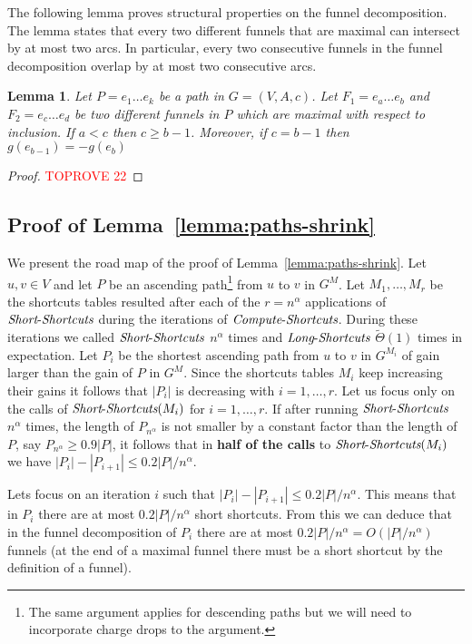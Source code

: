 \documentclass[11pt]{article}
\newtheorem{lemma}[theorem]{Lemma}
\newcommand{\LS}{\mbox{{\it Long}-{\it Shortcuts}}}
\newcommand{\Simple}{\mbox{{\it Short}-{\it Shortcuts}}}
\newcommand{\ComputeS}{\mbox{{\it Compute}-{\it Shortcuts}}}
\begin{document}
The following lemma proves structural properties on the funnel decomposition.
The lemma states that every two different funnels that are maximal can intersect by at most two arcs. In particular, every two consecutive funnels in the funnel decomposition overlap by at most two consecutive arcs.

\begin{lemma}\label{lemma:funnel-intersection}
    Let $P= e_1 \ldots e_k$ be a path in $G=(V,A,c)$. Let $F_1= e_a\ldots e_b$ and $F_2=e_c \ldots e_d$ be two different funnels in $P$ which are maximal with respect to inclusion. If $a<c$ then $c\ge b-1$. Moreover, if $c=b-1$ then $g(e_{b-1})=-g(e_{b})$
\end{lemma}

\begin{proof}\textcolor{red}{TOPROVE 22}\end{proof}


\subsection{Proof of Lemma~\ref{lemma:paths-shrink}}

We present the road map of the proof of Lemma~\ref{lemma:paths-shrink}. Let $u,v\in V$ and let $P$ be an ascending path\footnote{The same argument applies for descending paths but we will need to incorporate charge drops to the argument.} from $u$ to $v$ in $G^M$. Let $M_1,\ldots ,M_r$ be the shortcuts tables resulted after each of the $r = n^\alpha$ applications of $\Simple$ during the iterations of $\ComputeS$. During these iterations we called $\Simple$ $n^{\alpha}$ times and $\LS$ $\tilde{\Theta}(1)$ times in expectation. Let $P_i$ be the shortest ascending path from $u$ to $v$ in $G^{M_i}$ of gain larger than the gain of $P$ in $G^M$. Since the shortcuts tables $M_i$ keep increasing their gains it follows that $|P_i|$ is decreasing with $i=1,\ldots , r$.
Let us focus only on the calls of $\Simple(M_i)$ for $i=1,\ldots,r$. If after running $\Simple$ $n^\alpha$ times, the length of $P_{n^\alpha}$ is not smaller by a constant factor than the length of $P$, say $P_{n^\alpha} \ge 0.9 |P|$, it follows that in \textbf{half of the calls} to $\Simple(M_i)$ we have $|P_i| - |P_{i+1}| \le 0.2 |P|/n^{\alpha}$. 

Lets focus on an iteration $i$ such that 
$|P_i| - |P_{i+1}| \le 0.2 |P|/n^{\alpha}$. This means that in $P_i$ there are at most $ 0.2 |P|/n^{\alpha}$ short shortcuts. From this we can deduce that in the funnel decomposition of $P_i$ there are 
at most $0.2 |P|/n^{\alpha}=O(|P|/n^{\alpha})$ funnels (at the end of a maximal funnel there must be a short shortcut by the definition of a funnel).
\end{document}
